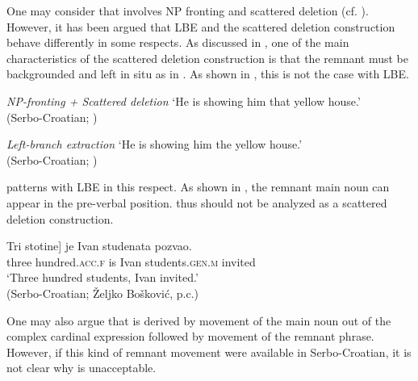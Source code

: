\documentclass[output=paper]{langscibook}
\begin{document}
One may consider that  involves NP fronting and scattered deletion (cf. \citealt{FanselowCavar2002}). However, it has been argued that LBE and the scattered deletion construction behave differently in some respects. As discussed in \citet{Boskovic2014}, one of the main characteristics of the scattered deletion construction is that the remnant must be backgrounded and left in situ as in . As shown in , this is not the case with LBE.

\ea\label{tat:ex:bos2}{\textit{NP-fronting + Scattered deletion}}
\z
\glt `He is showing him that yellow house.'\\
\hfill (Serbo-Croatian; \citealt[421]{Boskovic2014})
\z

\ea\label{tat:ex:bos3}{\textit{Left-branch extraction}}
\z
\glt `He is showing him the yellow house.'\\
\hfill (Serbo-Croatian; \citealt[421]{Boskovic2014})
\z

\noindent {} patterns with LBE in this respect. As shown in , the remnant main noun can appear in the pre-verbal position.  thus should not be analyzed as a scattered deletion construction.

\ea\label{tat:bos4}
\gll \minsp{[} Tri stotine] je Ivan studenata pozvao.\\  
     {} three hundred.\textsc{acc.f} is Ivan students.\textsc{gen.m} invited\\ 
\glt `Three hundred students, Ivan invited.'\\
\hfill(Serbo-Croatian; \v{Z}eljko Bo\v{s}kovi\'c, p.c.)
\z

\noindent One may also argue that  is derived by movement of the main noun out of the complex cardinal expression followed by movement of the remnant phrase. However, if this kind of remnant movement were available in Serbo-Croatian, it is not clear why  is unacceptable. 
\end{document}
